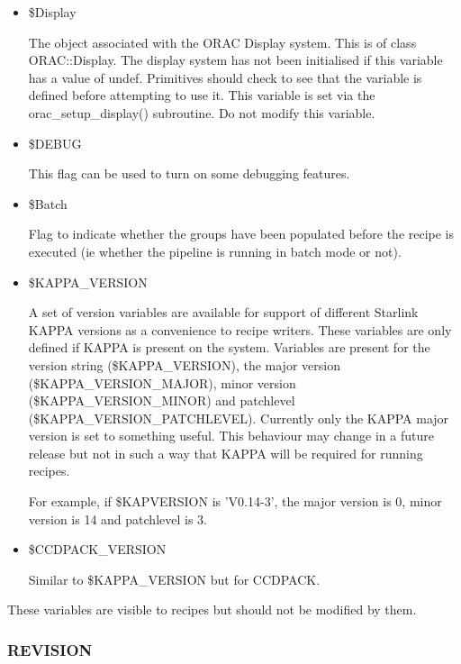 \begin{itemize}
\item \$Display

The object associated with the ORAC Display system. This
is of class ORAC::Display. The display system has not been
initialised if this variable has a value of undef. Primitives
should check to see that the variable is defined before
attempting to use it. This variable is set via the 
orac\_setup\_display() subroutine. Do not modify this variable.

\item \$DEBUG

This flag can be used to turn on some debugging features.

\item \$Batch

Flag to indicate whether the groups have been populated before
the recipe is executed (ie whether the pipeline is running in
batch mode or not).

\item \$KAPPA\_VERSION

A set of version variables are available for support of different
Starlink KAPPA versions as a convenience to recipe writers. These
variables are only defined if KAPPA is present on the
system. Variables are present for the version string (\$KAPPA\_VERSION),
the major version (\$KAPPA\_VERSION\_MAJOR), minor version
(\$KAPPA\_VERSION\_MINOR) and patchlevel (\$KAPPA\_VERSION\_PATCHLEVEL). Currently
only the KAPPA major version is set to something useful. This
behaviour may change in a future release but not in such a way that
KAPPA will be required for running recipes.



For example, if \$KAPVERSION is 'V0.14-3', the major version
is 0, minor version is 14 and patchlevel is 3.

\item \$CCDPACK\_VERSION

Similar to \$KAPPA\_VERSION but for CCDPACK.

\end{itemize}


These variables are visible to recipes but should not be modified
by them.

\subsubsection*{REVISION\label{ORAC::Basic_REVISION}}

